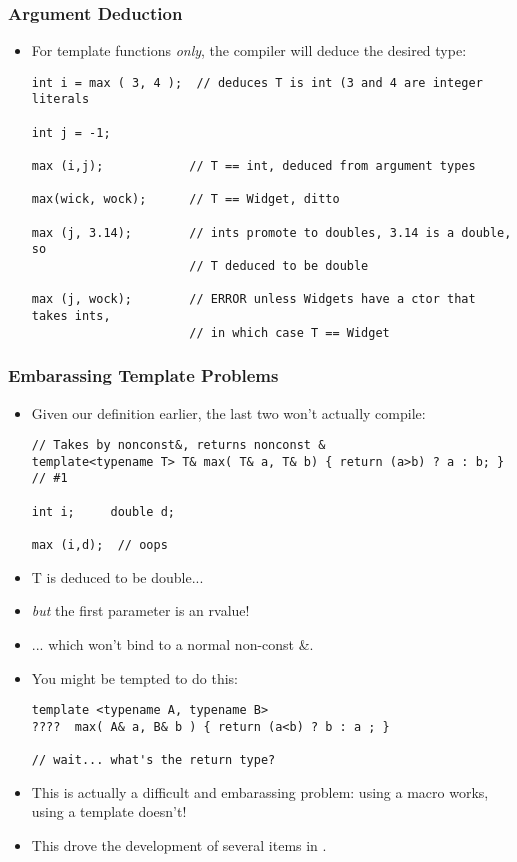 \begin{frame}[fragile,t]
\frametitle{Argument Deduction}

\begin{itemize}[<+->]
\item For template functions \emph{only}, the compiler will deduce the desired type:
{\scriptsize
\begin{verbatim}
int i = max ( 3, 4 );  // deduces T is int (3 and 4 are integer literals

int j = -1;

max (i,j);            // T == int, deduced from argument types

max(wick, wock);      // T == Widget, ditto

max (j, 3.14);        // ints promote to doubles, 3.14 is a double, so
                      // T deduced to be double

max (j, wock);        // ERROR unless Widgets have a ctor that takes ints,
                      // in which case T == Widget

\end{verbatim}
}

\end{itemize}
\end{frame}

\begin{frame}[fragile,t]
\frametitle{Embarassing Template Problems}

\begin{itemize}[<+->]
\item Given our definition earlier, the last two won't actually compile:
{\scriptsize
\begin{verbatim}
// Takes by nonconst&, returns nonconst &
template<typename T> T& max( T& a, T& b) { return (a>b) ? a : b; }  // #1

int i;     double d;

max (i,d);  // oops
\end{verbatim}
}
\item T is deduced to be double...
\item \emph{but} the first parameter is an rvalue!
\item ... which won't bind to a normal non-const \&.



\item You might be tempted to do this:
{\scriptsize
\begin{verbatim}
template <typename A, typename B>
????  max( A& a, B& b ) { return (a<b) ? b : a ; } 

// wait... what's the return type?
\end{verbatim}
}
\item This is actually a difficult and embarassing problem: using a macro works, using a template doesn't!

\item This drove the development of several items in .

\end{itemize}
\end{frame}

